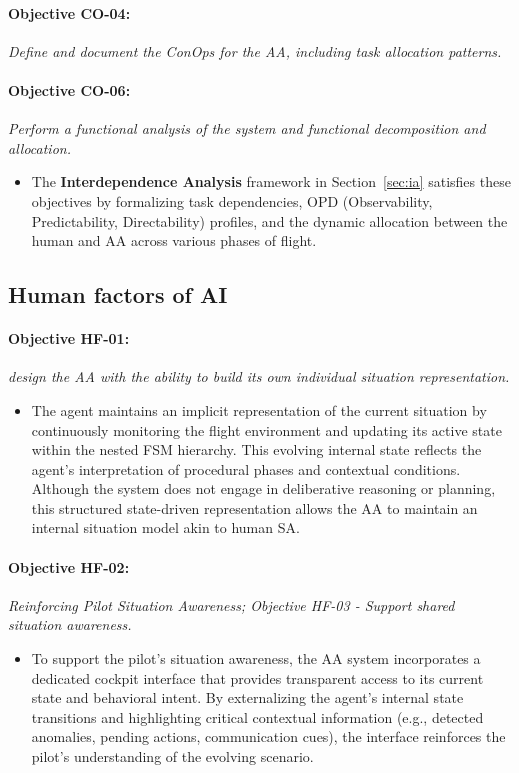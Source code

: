\documentclass[12pt,a4paper]{article} %
\begin{document}
	\paragraph{Objective CO-04:} \textit{Define and document the ConOps for the AA, including task allocation patterns.}
	
	\paragraph{Objective CO-06:} \textit{Perform a functional analysis of the system and functional decomposition and allocation.}
	
	\begin{itemize}
	  \item The \textbf{Interdependence Analysis} framework in Section~\ref{sec:ia} satisfies these objectives by formalizing task dependencies, OPD (Observability, Predictability, Directability) profiles, and the dynamic allocation between the human and AA across various phases of flight.
	\end{itemize}

	\subsection*{Human factors of AI}
	
	\paragraph{Objective HF-01:} \textit{design the AA with the ability to build its own individual situation representation.}
	\begin{itemize}
		\item The agent maintains an implicit representation of the current situation by continuously monitoring the flight environment and updating its active state within the nested FSM hierarchy. This evolving internal state reflects the agent's interpretation of procedural phases and contextual conditions. Although the system does not engage in deliberative reasoning or planning, this structured state-driven representation allows the AA to maintain an internal situation model akin to human SA. 
	\end{itemize}

	\paragraph{Objective HF-02:} \textit{Reinforcing Pilot Situation Awareness; Objective HF-03 - Support shared situation awareness.}  
	\begin{itemize}
		\item To support the pilot's situation awareness, the AA system incorporates a dedicated cockpit interface that provides transparent access to its current state and behavioral intent. By externalizing the agent's internal state transitions and highlighting critical contextual information (e.g., detected anomalies, pending actions, communication cues), the interface reinforces the pilot's understanding of the evolving scenario. 
	\end{itemize}
\end{document}

